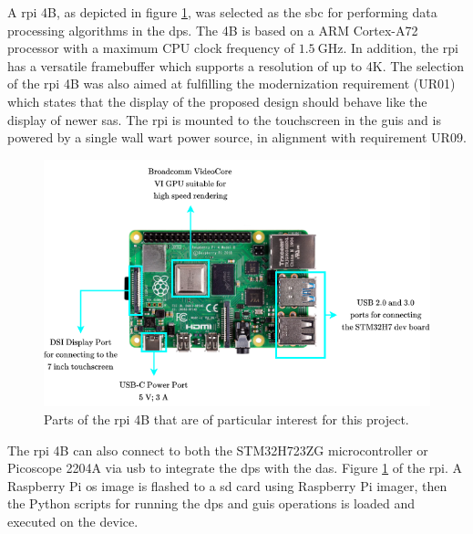 \documentclass[class=report,11pt,crop=false]{standalone}
\begin{document}
	A \acrfull{rpi} 4B, as depicted in figure \ref{fig:dps-rpi-4b}, was selected as the \acrshort{sbc} for performing data processing algorithms in the \acrshort{dps}. The 4B is based on a ARM Cortex-A72 processor with a maximum CPU clock frequency of $\SI{1.5}{\giga\hertz}$. In addition, the \acrshort{rpi} has a versatile framebuffer which supports a resolution of up to 4K. The selection of the \acrshort{rpi} 4B was also aimed at fulfilling the modernization requirement (UR01) which states that the display of the proposed design should behave like the display of newer \acrshort{sa}s. The \acrshort{rpi} is mounted to the touchscreen in the \acrshort{guis} and is powered by a single wall wart power source, in alignment with requirement UR09. 
	
	\begin{figure}[ht!]
		\centering
		\includegraphics[width=0.64\linewidth]{Figures/Methodology/dps-rpi-4b}
		\caption{Parts of the \acrshort{rpi} 4B that are of particular interest for this project.}
		\label{fig:dps-rpi-4b}
	\end{figure} 

	The \acrshort{rpi} 4B can also connect to both the STM32H723ZG microcontroller or Picoscope 2204A via \acrshort{usb} to integrate the \acrshort{dps} with the \acrshort{das}. Figure \ref{fig:dps-rpi-4b} of the \acrshort{rpi}. A Raspberry Pi \acrshort{os} image is flashed to a \acrshort{sd} card using Raspberry Pi imager, then the Python scripts for running the \acrshort{dps} and \acrshort{guis} operations is loaded and executed on the device. 
	
\end{document}
